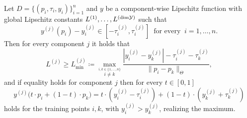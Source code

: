 \begin{prp}
    Let $D=\{ (p_i, \tau_i, y_i) \}_{i=1}^n$ and $y$ be a component-wise Lipschitz function with global Lipschitz constants $L^{(1)},\dots, L^{(\text{dim}\mathcal Y)}$ such that 
    \[
        y^{(j)}(p_i) -y_i^{(j)} \in  [-\tau_i^{(j)},\tau_i^{(j)}] \ \text{ for every } \ i = 1, \dots, n.
    \]
    Then for every component $j$ it holds that
    \begin{equation}\label{eq:LR-const}
        L^{(j)} \geq L^{(j)}_{\min}\coloneq \max_{ \stackrel{i, k \in \{1, \dots, n\}}{i\neq k} } \frac{| y_i^{(j)} - y_k^{(j)} | - \tau_i^{(j)} - \tau_k^{(j)}}{\| p_i - p_k \|_\Theta},
    \end{equation}
    and if equality holds for component $j$ then for every $t \in [0,1]$ \[
     y^{(j)}\big (t \cdot p_i + (1 - t) \cdot p_k \big )  = t \cdot \left(y_i^{(j)} - \tau_i^{(j)} \right) + (1 - t) \cdot \left(y_k^{(j)} + \tau_k^{(j)} \right)
    \]holds for the training points $i,k$, with $y^{(j)}_i > y^{(j)}_k$, realizing the maximum. 
\end{prp}
